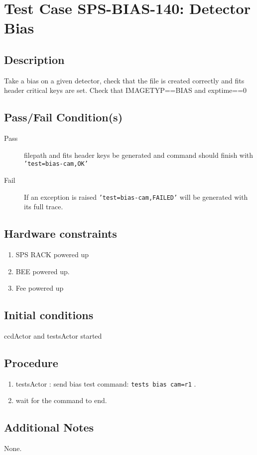 \section{Test Case SPS-BIAS-140: Detector Bias}

\subsection{Description}

Take a bias on a given detector, check that the file is created correctly and fits header critical keys are set.
Check that IMAGETYP==BIAS and exptime==0


\subsection{Pass/Fail Condition(s)}

\begin{description}
\item [Pass] filepath and fits header keys be generated and command should finish with \texttt{'test=bias-cam,OK'}
\item [Fail] If an exception is raised \texttt{'test=bias-cam,FAILED'} will be generated with its full trace.

\end{description}

\subsection{Hardware constraints}

\begin{enumerate}
    \item SPS RACK powered up
    \item BEE powered up.
    \item Fee powered up
\end{enumerate}

\subsection{Initial conditions}

ccdActor and testsActor started

\subsection{Procedure}

\begin{enumerate}
    \item testsActor : send bias test command: \texttt{tests bias cam=r1} .
    \item wait for the command to end.
\end{enumerate}

\subsection{Additional Notes}
None.
